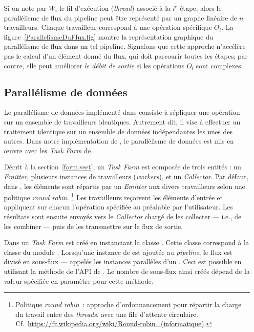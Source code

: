 Si on note par $W_i$ le fil d'ex\'ecution (\emph{thread}) associ\'e à la $i^{\grave e}$ {étape}, alors
le parall\'elisme de flux du pipeline peut \^etre repr\'esent\'e par un graphe lin\'eaire de $n$ travailleurs. Chaque travailleur correspond \`a une op\'eration sp\'ecifique $O_i$. La figure~\ref{ParallelismeDuFlux.fig} montre la repr\'esentation graphique du parall\'elisme de flux dans un tel pipeline. Signalons que cette approche n'acc\'el\`ere pas le calcul d'un \'el\'ement donné du flux, qui doit parcourir toutes les étapes; par contre, elle peut am\'eliorer \emph{le d\'ebit de sortie} si les opérations $O_i$ sont complexes.

\subsection{Parall\'elisme de donn\'ees}
\label{ParallelismeDeDonnees.sect}

Le parall\'elisme de donn\'ees impl\'ement\'e dans   consiste \`a r\'epliquer une op\'eration sur un ensemble de travailleurs identiques. Autrement dit, il vise \`a effectuer un traitement identique sur un ensemble de donn\'ees ind\'ependantes les unes des autres. 
%
Dans notre impl\'ementation de \PpFf, le parall\'elisme de donn\'ees est mis en \oe{}uvre avec les \emph{Task Farm} de .


D\'ecrit \`a la section~\ref{farm.sect}, un \emph{Task Farm} est compos\'ee de trois entit\'es : un \emph{Emitter}, plusieurs instances de travailleurs (\emph{workers}), et un \emph{Collector}. Par d\'efaut, dans \PpFf{}, les \'el\'ements sont r\'epartis par un \emph{Emitter} aux divers travailleurs selon une politique \emph{round robin}.%
%
\footnote{Politique \emph{round robin}~: approche d'ordonnancement pour r\'epartir la charge du travail entre des \emph{threads}, avec une file d'attente circulaire. Cf.~\url{https://fr.wikipedia.org/wiki/Round-robin_(informatique)}.} 
%
Les travailleurs re\c{c}oivent les \'el\'ements d'entr\'ee et appliquent sur chacun l'op\'eration sp\'ecifi\'ee au pr\'ealable par l'utilisateur. Les r\'esultats sont ensuite envoy\'es vers le \emph{Collector} charg\'e de les collecter --- i.e., de les combiner --- puis de les transmettre sur le flux de sortie.

Dans  un \emph{Task Farm} est cr\'e\'e en instanciant la classe . Cette classe correspond \`a la classe  du module . Lorsqu'une instance de  est ajout\'ee au \emph{pipeline}, le flux est divis\'e en sous-flux --- appel\'es les instances parall\`eles d'un . Ceci est possible en utilisant la m\'ethode  de l'API de . Le nombre de sous-flux ainsi cr\'e\'es d\'epend de la valeur sp\'ecifi\'ee en param\`etre pour cette m\'ethode.  

